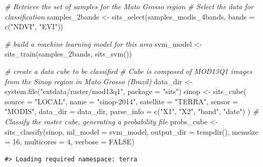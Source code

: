 \documentclass[a4paper,]{tufte-book}
\newenvironment{Shaded}{}{}
\newcommand{\AttributeTok}[1]{\textcolor[rgb]{0.49,0.56,0.16}{#1}}
\newcommand{\CommentTok}[1]{\textcolor[rgb]{0.38,0.63,0.69}{\textit{#1}}}
\newcommand{\ConstantTok}[1]{\textcolor[rgb]{0.53,0.00,0.00}{#1}}
\newcommand{\DecValTok}[1]{\textcolor[rgb]{0.25,0.63,0.44}{#1}}
\newcommand{\FunctionTok}[1]{\textcolor[rgb]{0.02,0.16,0.49}{#1}}
\newcommand{\NormalTok}[1]{#1}
\newcommand{\OtherTok}[1]{\textcolor[rgb]{0.00,0.44,0.13}{#1}}
\newcommand{\StringTok}[1]{\textcolor[rgb]{0.25,0.44,0.63}{#1}}
\begin{document}
\begin{Shaded}
\begin{Highlighting}[]
\CommentTok{\# Retrieve the set of samples for the Mato Grosso region }
\CommentTok{\# Select the data for classification}
\NormalTok{samples\_2bands  }\OtherTok{\textless{}{-}} \FunctionTok{sits\_select}\NormalTok{(samples\_modis\_4bands, }
                               \AttributeTok{bands =} \FunctionTok{c}\NormalTok{(}\StringTok{"NDVI"}\NormalTok{, }\StringTok{"EVI"}\NormalTok{))}

\CommentTok{\# build a machine learning model for this area}
\NormalTok{svm\_model }\OtherTok{\textless{}{-}} \FunctionTok{sits\_train}\NormalTok{(samples\_2bands, }\FunctionTok{sits\_svm}\NormalTok{())}

\CommentTok{\# create a data cube to be classified}
\CommentTok{\# Cube is composed of MOD13Q1 images from the Sinop region in Mato Grosso (Brazil)}
\NormalTok{data\_dir }\OtherTok{\textless{}{-}} \FunctionTok{system.file}\NormalTok{(}\StringTok{"extdata/raster/mod13q1"}\NormalTok{, }\AttributeTok{package =} \StringTok{"sits"}\NormalTok{)}
\NormalTok{sinop }\OtherTok{\textless{}{-}} \FunctionTok{sits\_cube}\NormalTok{(}
    \AttributeTok{source =} \StringTok{"LOCAL"}\NormalTok{,}
    \AttributeTok{name =} \StringTok{"sinop{-}2014"}\NormalTok{,}
    \AttributeTok{satellite =} \StringTok{"TERRA"}\NormalTok{,}
    \AttributeTok{sensor =} \StringTok{"MODIS"}\NormalTok{,}
    \AttributeTok{data\_dir =}\NormalTok{ data\_dir,}
    \AttributeTok{parse\_info =} \FunctionTok{c}\NormalTok{(}\StringTok{"X1"}\NormalTok{, }\StringTok{"X2"}\NormalTok{, }\StringTok{"band"}\NormalTok{, }\StringTok{"date"}\NormalTok{)}
\NormalTok{)}
\CommentTok{\# Classify the raster cube, generating a probability file}
\NormalTok{probs\_cube }\OtherTok{\textless{}{-}} \FunctionTok{sits\_classify}\NormalTok{(sinop, }
                            \AttributeTok{ml\_model =}\NormalTok{ svm\_model, }
                            \AttributeTok{output\_dir =} \FunctionTok{tempdir}\NormalTok{(),}
                            \AttributeTok{memsize =} \DecValTok{16}\NormalTok{,}
                            \AttributeTok{multicores =} \DecValTok{4}\NormalTok{,}
                            \AttributeTok{verbose =} \ConstantTok{FALSE}\NormalTok{)}
\end{Highlighting}
\end{Shaded}

\begin{verbatim}
#> Loading required namespace: terra
\end{verbatim}
\end{document}
